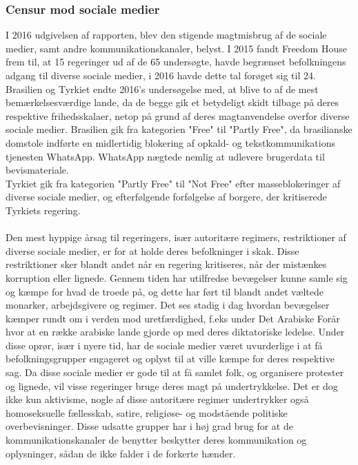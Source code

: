 \subsubsection{Censur mod sociale medier}
I 2016 udgivelsen af rapporten, blev den stigende magtmisbrug af de sociale medier, samt andre kommunikationskanaler, belyst. I 2015 fandt Freedom House frem til, at 15 regeringer ud af de 65 undersøgte, havde begrænset befolkningens adgang til diverse sociale medier, i 2016 havde dette tal forøget sig til 24. Brasilien og Tyrkiet endte 2016's undersøgelse med, at blive to af de mest bemærkelsesværdige lande, da de begge gik et betydeligt skidt tilbage på deres respektive frihedsskalaer, netop på grund af deres magtanvendelse overfor diverse sociale medier. Brasilien gik fra kategorien "Free" til "Partly Free", da brasilianske domstole indførte en midlertidig blokering af opkald- og tekstkommunikations tjenesten WhatsApp. WhatsApp nægtede nemlig at udlevere brugerdata til bevismateriale.\\ 
Tyrkiet gik fra kategorien "Partly Free" til "Not Free" efter masseblokeringer af diverse sociale medier, og efterfølgende forfølgelse af borgere, der kritiserede Tyrkiets regering.\cite{FreedomHouseRapport2016}\\\\
\noindent
Den mest hyppige årsag til regeringers, især autoritære regimers, restriktioner af diverse sociale medier, er for at holde deres befolkninger i skak. Disse restriktioner sker blandt andet når en regering kritiseres, når der mistænkes korruption eller lignede. Gennem tiden har utilfredse bevægelser kunne samle sig og kæmpe for hvad de troede på, og dette har ført til blandt andet væltede monarker, arbejdsgivere og regimer. Det ses stadig i dag hvordan bevægelser kæmper rundt om i verden mod uretfærdighed, f.eks under Det Arabiske Forår hvor at en række arabiske lande gjorde op med deres diktatoriske ledelse.\cite{ArabiskeForaar} Under disse oprør, især i nyere tid, har de sociale medier været uvurderlige i at få befolkningsgrupper engageret og oplyst til at ville kæmpe for deres respektive sag. Da disse sociale medier er gode til at få samlet folk, og organisere protester og lignede, vil visse regeringer bruge deres magt på undertrykkelse. Det er dog ikke kun aktivisme, nogle af disse autoritære regimer undertrykker også homoseksuelle fællesskab, satire, religiøse- og modstående politiske overbevisninger. Disse udsatte grupper har i høj grad brug for at de kommunikationskanaler de benytter beskytter deres kommunikation og oplysninger, sådan de ikke falder i de forkerte hænder.

